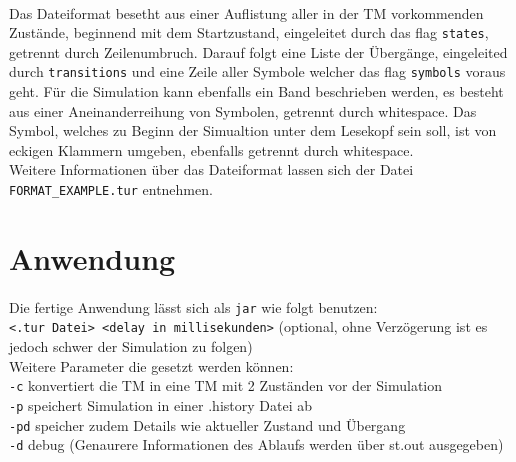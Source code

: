 \documentclass[10pt, a4paper]{article}
\newcommand{\ilc}{\texttt}
\begin{document}
\paragraph*{}
Das Dateiformat besetht aus einer Auflistung aller in der TM vorkommenden Zustände, beginnend mit dem Startzustand, eingeleitet durch das flag \ilc{states}, getrennt durch Zeilenumbruch. Darauf folgt eine Liste der Übergänge, eingeleited durch \ilc{transitions} und eine Zeile aller Symbole welcher das flag \ilc{symbols} voraus geht. Für die Simulation kann ebenfalls ein Band beschrieben werden, es besteht aus einer Aneinanderreihung von Symbolen, getrennt durch whitespace. Das Symbol, welches zu Beginn der Simualtion unter dem Lesekopf sein soll, ist von eckigen Klammern umgeben, ebenfalls getrennt durch whitespace.\\
Weitere Informationen über das Dateiformat lassen sich der Datei \ilc{FORMAT\_EXAMPLE.tur} entnehmen.\par

\section*{Anwendung}
\paragraph*{}
Die fertige Anwendung lässt sich als \ilc{jar} wie folgt benutzen:\\
\ilc{<.tur Datei> <delay in millisekunden>} (optional, ohne Verzögerung ist es jedoch schwer der Simulation zu folgen)\\
Weitere Parameter die gesetzt werden können:\\
\ilc{-c} konvertiert die TM in eine TM mit 2 Zuständen vor der Simulation\\
\ilc{-p} speichert Simulation in einer .history Datei ab\\
\ilc{-pd} speicher zudem Details wie aktueller Zustand und Übergang\\
\ilc{-d} debug (Genaurere Informationen des Ablaufs werden über st.out ausgegeben)
\end{document}
